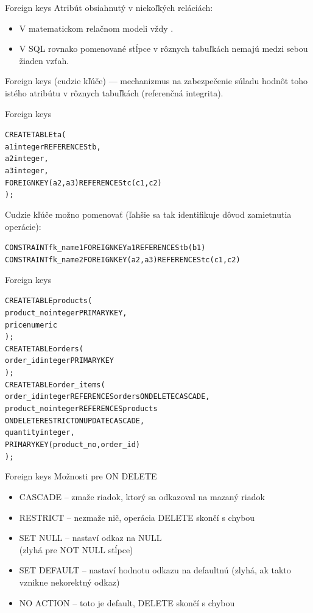 \documentclass[12pt]{beamer}
\def\blue#1{\textcolor{Cerulean}{#1}}
\begin{document}
\begin{frame}[fragile]{Foreign keys}
Atribút obsiahnutý v niekoľkých reláciách:
\begin{itemize}
\item V matematickom relačnom modeli vždy .
\item V SQL rovnako pomenované stĺpce v rôznych tabuľkách nemajú medzi sebou žiaden vzťah.
\end{itemize}
\alert{Foreign keys} (cudzie kľúče) --- mechanizmus na zabezpečenie súladu hodnôt toho istého atribútu v rôznych tabuľkách (referenčná integrita).
\end{frame}

\begin{frame}[fragile]{Foreign keys}
\begin{alltt}
CREATE TABLE ta (
  a1 integer \alert{REFERENCES tb},
  a2 integer,
  a3 integer,
  \alert{FOREIGN KEY (a2, a3) REFERENCES tc (c1, c2)}
);
\end{alltt}
Cudzie kľúče možno pomenovať (ľahšie sa tak identifikuje dôvod zamietnutia operácie):
{\scriptsize
\begin{alltt}
  CONSTRAINT fk_name1 FOREIGN KEY a1 REFERENCES tb (b1)
  CONSTRAINT fk_name2 FOREIGN KEY (a2, a3) REFERENCES tc (c1, c2)
\end{alltt}
}
\end{frame}

\begin{frame}[fragile]{Foreign keys}
\hbox{}{\small
\begin{alltt}
CREATE TABLE products (
  product_no integer PRIMARY KEY,
  price numeric
);
CREATE TABLE orders (
  order_id integer PRIMARY KEY
);
CREATE TABLE order_items (
  order_id integer \alert{REFERENCES orders} \blue{ON DELETE CASCADE},
  product_no integer \alert{REFERENCES products}
      \blue{ON DELETE RESTRICT ON UPDATE CASCADE},
  quantity integer,
  PRIMARY KEY (product_no, order_id)
);
\end{alltt}
}
\end{frame}

\begin{frame}[fragile]{Foreign keys}
Možnosti pre \blue{ON DELETE}
\begin{itemize}
\item \alert{CASCADE} -- zmaže riadok, ktorý sa odkazoval na mazaný riadok
\item \alert{RESTRICT} -- nezmaže nič, operácia DELETE skončí s chybou
\item SET NULL -- nastaví odkaz na NULL\\ (zlyhá pre NOT NULL stĺpce)
\item SET DEFAULT -- nastaví hodnotu odkazu na defaultnú
(zlyhá, ak takto vznikne nekorektný odkaz)
\item NO ACTION -- toto je default, DELETE skončí s chybou
\end{itemize}
\end{frame}
\end{document}
